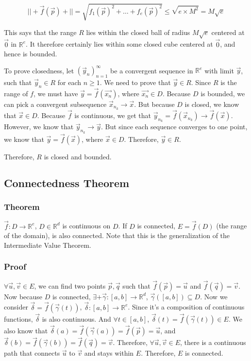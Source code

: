 \documentclass[11 pt, twoside]{article}
\begin{document}
$$||+\vec{f}(\vec{p})+|| = \sqrt{f_1(\vec{p})^2 + \dots + f_e(\vec{p})^2} \leq
\sqrt{e \times M^2} = M \sqrt{e}$$

This says that the range $R$ lies within the closed ball of radius $M\sqrt{e}$
centered at $\vec{0}$ in $\mathbb{R}^e$. It therefore certainly lies within
some closed cube centered at $\vec{0}$, and hence is bounded.

To prove closedness, let $(\vec{y}_n)_{n = 1}^\infty$ be a convergent sequence in
$\mathbb{R}^e$ with limit $\vec{y}$, such that $\vec{y}_n \in R$ for each $n
\geq 1$. We need to prove that $\vec{y} \in R$. Since $R$ is the range of $f$,
we must have $\vec{y} = \vec{f}(\vec{x_n})$, where $\vec{x_n} \in D$. Because
$D$ is bounded, we can pick a convergent subsequence $\vec{x}_{n_k} \to
\vec{x}$. But because $D$ is closed, we know that $\vec{x} \in D$. Because
$\vec{f}$ is continuous, we get that $\vec{y}_{n_k} = \vec{f}(\vec{x}_{n_k}) \to
\vec{f}(\vec{x})$. However, we know that $\vec{y}_{n_k} \to \vec{y}$. But since
each sequence converges to one point, we know that $\vec{y} = \vec{f}(\vec{x})$,
where $\vec{x} \in D$. Therefore, $\vec{y} \in R$.

Therefore, $R$ is closed and bounded.

\subsection{Connectedness Theorem}

\subsubsection{Theorem}

$\vec{f}: D \to \mathbb{R}^e$, $D \in \mathbb{R}^d$ is continuous on $D$.
If $D$ is connected, $E = \vec{f}(D)$ (the range of the domain), is also
connected. Note that this is the generalization of the Intermediate Value
Theorem.

\subsubsection{Proof}

$\forall \vec{u}, \vec{v} \in E$, we can find two points $\vec{p}, \vec{q}$ such
that $\vec{f}(\vec{p}) = \vec{u}$ and $\vec{f}(\vec{q}) = \vec{v}$. Now because
$D$ is connected, $\exists+ \vec{\gamma}: [a, b] \to \mathbb{R}^d$,
$\vec{\gamma}([a, b]) \subseteq D$. Now we consider $\vec{\delta} =
\vec{f}(\vec{\gamma}(t))$, $\vec{\delta} : [a, b] \to \mathbb{R}^e$. Since
it's a composition of continuous functions, $\vec{\delta}$ is also continuous.
And $\forall t \in [a, b]$, $\vec{\delta}(t) = \vec{f}(\vec{\gamma}(t)) \in E$.
We also know that $\vec{\delta}(a) = \vec{f}(\vec{\gamma}(a)) = \vec{f}(\vec{p})
= \vec{u}$, and $\vec{\delta}(b) = \vec{f}(\vec{\gamma}(b)) = \vec{f}(\vec{q})
= \vec{v}$. Therefore, $\forall \vec{u}, \vec{v} \in E$, there is a
continuous path that connects $\vec{u}$ to $\vec{v}$ and stays within $E$.
Therefore, $E$ is connected.
\end{document}
